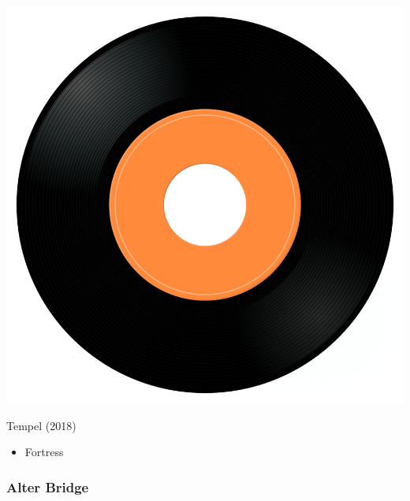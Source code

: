 \begin{minipage}[t]{0.25\textwidth}\vspace{0pt}
\captionsetup{type=figure}
\includegraphics[width=\textwidth]{Images/cover.png}
\caption*{Tempel (2018)}
\end{minipage}
\begin{minipage}[t]{0.25\textwidth}\vspace{0pt}
\begin{itemize}[nosep,leftmargin=1em,labelwidth=*,align=left]
	\setlength{\itemsep}{0pt}
	\item Fortress
\end{itemize}
\end{minipage}

\subsubsection{Alter Bridge}

